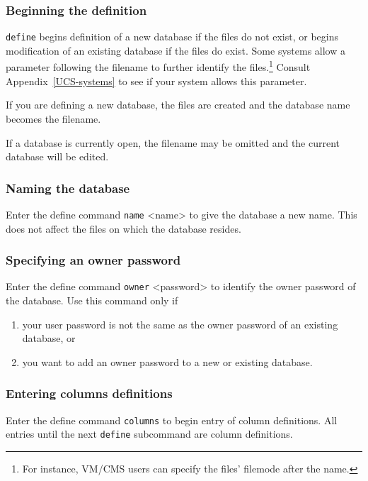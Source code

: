 \documentclass[11pt,a4paper]{report}
\begin{document}
\subsubsection{Beginning the definition}
%
\verb!define! 
begins definition of a new database if the files do not exist, or
begins modification of an existing database if the files do exist.
Some systems allow a parameter following the filename to further
identify the files.\footnote{For instance, VM/CMS users can
specify the files' filemode after the name.}
Consult Appendix~\ref{UCS-systems}
to see if your system allows this parameter.
 
If you are defining a new database, the files are created
and the database name becomes the filename.
 
If a database is currently open, the filename may be omitted
and the current database will be edited.
 
\subsubsection{Naming the database}
%
Enter the define command
\verb!name! <name>
to give the database a new name.  This does not affect the
files on which the database resides.
 
 
\subsubsection{Specifying an owner password}
%
Enter the define command
\verb!owner! <password>
to identify the owner password of the database.
Use this command only if
 
\begin{enumerate}
\item your user password is not the same as the owner password
   of an existing database, or
\item you want to add an owner password to a new or existing
   database.
\end{enumerate}
 
\subsubsection{Entering columns definitions}
%
Enter the define command
\verb!columns!
to begin entry of column definitions.
All entries until the next \verb!define! subcommand
are column definitions.
\end{document}
